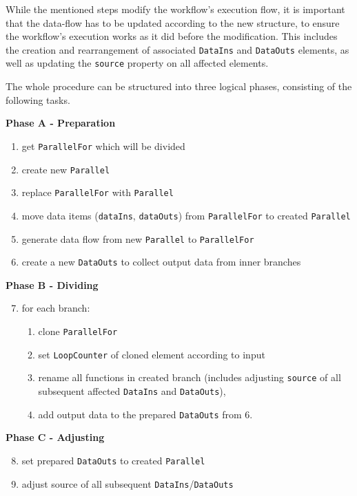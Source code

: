 \documentclass[a4paper,top=25mm,bottom=25mm,12pt,pdftex,halfparskip,twoside,bibtotoc,numbers=noenddot]{scrbook}
\begin{document}
While the mentioned steps modify the workflow's execution flow, it is important that the data-flow has to be updated according to the new structure, to ensure the workflow's execution works as it did before the modification. This includes the creation and rearrangement of associated \texttt{DataIns} and \texttt{DataOuts} elements, as well as updating the \texttt{source} property on all affected elements. 

The whole procedure can be structured into three logical phases, consisting of the following tasks.

\textbf{Phase A - Preparation}
\begin{enumerate}
\item get \texttt{ParallelFor} which will be divided
\item create new \texttt{Parallel}
\item replace \texttt{ParallelFor} with \texttt{Parallel}
\item move data items (\texttt{dataIns}, \texttt{dataOuts}) from \texttt{ParallelFor} to created \texttt{Parallel}
\item generate data flow from new \texttt{Parallel} to \texttt{ParallelFor}
\item create a new \texttt{DataOuts} to collect output data from inner branches
\end{enumerate}

\textbf{Phase B - Dividing}
\begin{enumerate}
\setcounter{enumi}{6}
\item for each branch:
\begin{enumerate}
\item clone \texttt{ParallelFor}
\item set \texttt{LoopCounter} of cloned element according to input
\item rename all functions in created branch (includes adjusting \texttt{source} of all subsequent affected \texttt{DataIns} and \texttt{DataOuts}), 
\item add output data to the prepared \texttt{DataOuts} from 6.
\end{enumerate}
\end{enumerate}

\textbf{Phase C - Adjusting}
\begin{enumerate}
\setcounter{enumi}{7}
\item set prepared \texttt{DataOuts} to created \texttt{Parallel}
\item adjust source of all subsequent \texttt{DataIns}/\texttt{DataOuts}
\end{enumerate}
\end{document}
